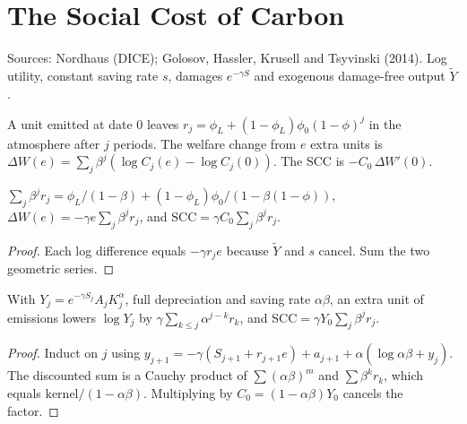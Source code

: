 \chapter{The Social Cost of Carbon}
\label{chap:climate}

Sources: Nordhaus (DICE); Golosov, Hassler, Krusell and Tsyvinski (2014). Log utility, constant saving rate $s$,
damages $e^{-\gamma S}$ and exogenous damage-free output $\tilde Y$.

\begin{definition}
\label{def:scc_model}
\leanok
A unit emitted at date 0 leaves $r_j = \phi_L + (1-\phi_L)\phi_0(1-\phi)^j$ in the atmosphere after $j$ periods. The
welfare change from $e$ extra units is $\Delta W(e) = \sum_j\beta^j(\log C_j(e) - \log C_j(0))$. The SCC is
$-C_0\,\Delta W'(0)$.
\end{definition}

\begin{theorem}
\label{thm:scc}
\leanok
{}
$\sum_j\beta^jr_j = \phi_L/(1-\beta) + (1-\phi_L)\phi_0/(1-\beta(1-\phi))$, $\Delta W(e) = -\gamma e\sum_j\beta^jr_j$, and
$\mathrm{SCC} = \gamma C_0\sum_j\beta^jr_j$.
\end{theorem}
\begin{proof}
\leanok
Each log difference equals $-\gamma r_je$ because $\tilde Y$ and $s$ cancel. Sum the two geometric series.
\end{proof}

\begin{theorem}
\label{thm:scc_capital}
\leanok
{}
With $Y_j = e^{-\gamma S_j}A_jK_j^\alpha$, full depreciation and saving rate $\alpha\beta$, an extra unit of
emissions lowers $\log Y_j$ by $\gamma\sum_{k\le j}\alpha^{j-k}r_k$, and $\mathrm{SCC} = \gamma Y_0\sum_j\beta^jr_j$.
\end{theorem}
\begin{proof}
\leanok
Induct on $j$ using $y_{j+1} = -\gamma(S_{j+1}+r_{j+1}e) + a_{j+1} + \alpha(\log\alpha\beta + y_j)$. The discounted
sum is a Cauchy product of $\sum(\alpha\beta)^m$ and $\sum\beta^kr_k$, which equals $\mathrm{kernel}/(1-\alpha\beta)$.
Multiplying by $C_0 = (1-\alpha\beta)Y_0$ cancels the factor.
\end{proof}

